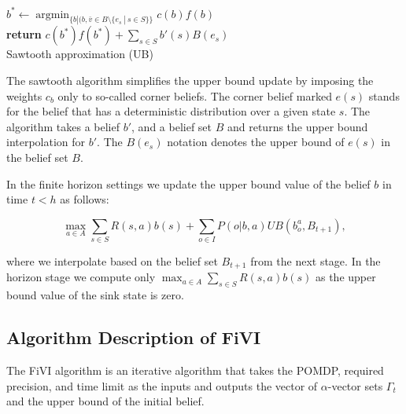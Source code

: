 \LinesNumbered
\begin{algorithm}[H]
    
   
    \SetAlgoLined
    $ b^* \xleftarrow{} \operatorname{argmin}_{\{b|(b, \bar{v} \in B \setminus \{e_s\ |\ s \in S\}\}} c(b) f(b) $ \\
    \textbf{return} $c(b^*) f(b^*) + \sum_{s \in S} b'(s) B(e_s) $ \\


\caption{Sawtooth approximation (UB)}
\end{algorithm}

The sawtooth algorithm simplifies the upper bound update by imposing the weights $c_b$ only to so-called corner beliefs. The corner belief marked $e(s)$ stands for the belief that has a deterministic distribution over a given state $s$. The algorithm takes a belief $b'$, and a belief set $B$ and returns the upper bound interpolation for $b'$. The $B(e_s)$ notation denotes the upper bound of $e(s)$ in the belief set $B$.

In the finite horizon settings we update the upper bound value of the belief $b$ in time $t < h$ as follows:

\begin{equation}
    \operatorname{max}_{a \in A} \sum_{s \in S} R(s, a)b(s) + \sum_{o \in I} P(o|b, a) UB(b^a_o, B_{t+1}),
\end{equation}

where we interpolate based on the belief set $B_{t+1}$ from the next stage. In the horizon stage we compute only $\operatorname{max}_{a \in A} \sum_{s \in S} R(s, a)b(s)$ as the upper bound value of the sink state is zero.


\subsection{Algorithm Description of FiVI}

The FiVI algorithm is an iterative algorithm that takes the POMDP, required precision, and time limit as the inputs and outputs the vector of $\alpha$-vector sets $\Gamma_t$ and the upper bound of the initial belief. 

